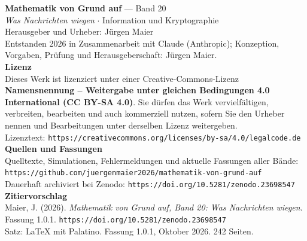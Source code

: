 \thispagestyle{empty}
\vspace*{\fill}
\begin{flushleft}
{\small\color{grau}
\textbf{\color{tief}Mathematik von Grund auf} --- Band 20\\[2pt]
\textit{Was Nachrichten wiegen} $\cdot$ Information und Kryptographie\\[14pt]

Herausgeber und Urheber: Jürgen Maier\\[2pt]
Entstanden 2026 in Zusammenarbeit mit Claude (Anthropic); Konzeption, Vorgaben, Prüfung und Herausgeberschaft: Jürgen Maier.\\[14pt]

\textbf{Lizenz}\\[2pt]
Dieses Werk ist lizenziert unter einer Creative-Commons-Lizenz \textbf{Namensnennung -- Weitergabe unter gleichen Bedingungen 4.0 International (CC BY-SA 4.0)}. Sie dürfen das Werk vervielfältigen, verbreiten, bearbeiten und auch kommerziell nutzen, sofern Sie den Urheber nennen und Bearbeitungen unter derselben Lizenz weitergeben.\\[2pt]
Lizenztext: \texttt{https://creativecommons.org/licenses/by-sa/4.0/legalcode.de}\\[14pt]

\textbf{Quellen und Fassungen}\\[2pt]
Quelltexte, Simulationen, Fehlermeldungen und aktuelle Fassungen aller Bände:\\
\texttt{https://github.com/juergenmaier2026/mathematik-von-grund-auf}\\[2pt]
Dauerhaft archiviert bei Zenodo: \texttt{https://doi.org/10.5281/zenodo.23698547}\\[14pt]

\textbf{Zitiervorschlag}\\[2pt]
Maier, J. (2026). \textit{Mathematik von Grund auf, Band 20: Was Nachrichten wiegen}. Fassung 1.0.1. \texttt{https://doi.org/10.5281/zenodo.23698547}\\[14pt]

Satz: \LaTeX{} mit Palatino. Fassung 1.0.1, Oktober 2026. 242 Seiten.
}
\end{flushleft}
\vspace*{1.5cm}
